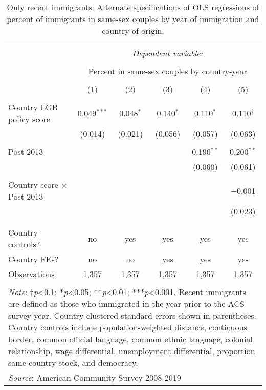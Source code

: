 \documentclass[
  11pt,
]{article}
\begin{document}
\begin{table}[H] \centering 
  \caption{Only recent immigrants: Alternate specifications of OLS regressions of percent of immigrants in same-sex couples by year of immigration and country of origin.} 
  \label{tab:country-props-pastyear} 
\begin{tabular}{@{\extracolsep{5pt}}lccccc} 
\\[-1.8ex]\hline 
\hline \\[-1.8ex] 
 & \multicolumn{5}{c}{\textit{Dependent variable:}} \\ 
\cline{2-6} 
\\[-1.8ex] & \multicolumn{5}{c}{Percent in same-sex couples by country-year} \\ 
\\[-1.8ex] & (1) & (2) & (3) & (4) & (5)\\ 
\hline \\[-1.8ex] 
 Country LGB policy score & 0.049$^{***}$ & 0.048$^{*}$ & 0.140$^{*}$ & 0.110$^{*}$ & 0.110$^{†}$ \\ 
  & (0.014) & (0.021) & (0.056) & (0.057) & (0.063) \\ 
  & & & & & \\ 
 Post-2013 &  &  &  & 0.190$^{**}$ & 0.200$^{**}$ \\ 
  &  &  &  & (0.060) & (0.061) \\ 
  & & & & & \\ 
 Country score × Post-2013 &  &  &  &  & $-$0.001 \\ 
  &  &  &  &  & (0.023) \\ 
  & & & & & \\ 
\hline \\[-1.8ex] 
Country controls? & no & yes & yes & yes & yes \\ 
Country FEs? & no & no & yes & yes & yes \\ 
Observations & 1,357 & 1,357 & 1,357 & 1,357 & 1,357 \\ 
\hline 
\hline \\[-1.8ex] 
\multicolumn{6}{l}{\parbox[t]{.8\textwidth}{\textit{Note}: †\textit{p}<0.1; *\textit{p}<0.05; **\textit{p}<0.01; ***\textit{p}<0.001. Recent immigrants are defined as those who immigrated in the year prior to the ACS survey year. Country-clustered standard errors shown in parentheses. Country controls include population-weighted distance, contiguous border, common official language, common ethnic language, colonial relationship, wage differential, unemployment differential, proportion same-country stock, and democracy.}} \\ 
\multicolumn{6}{l}{\textit{Source}: American Community Survey 2008-2019} \\ 
\end{tabular} 
\end{table}
\end{document}
